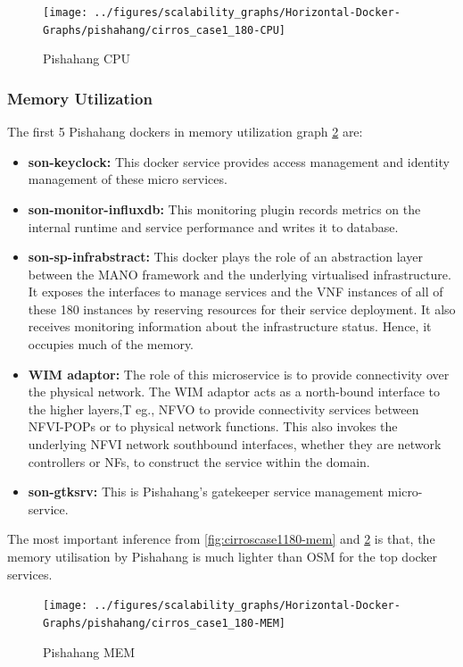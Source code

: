 \begin{figure}[h]
	\centering
	\texttt{[image: ../figures/scalability\_graphs/Horizontal-Docker-Graphs/pishahang/cirros\_case1\_180-CPU]}
	\caption{Pishahang CPU}
	\label{fig:pishcirroscase1180-cpu}
\end{figure}
\pagebreak
\subsubsection{Memory Utilization}
The first 5 Pishahang dockers in memory utilization graph \ref{fig:pishcirroscase1180-mem} are:

\begin{itemize}
	\item \textbf{son-keyclock:} This docker service provides access management and identity management of these micro services.
	\item \textbf{son-monitor-influxdb:} This monitoring plugin records metrics on the internal runtime and service performance and writes it to database.
	\item \textbf{son-sp-infrabstract:}  This docker plays the role of an abstraction layer between the MANO framework and the underlying virtualised infrastructure. It exposes the interfaces to manage services and the VNF instances of all of these 180 instances by reserving resources for their service deployment. It also receives monitoring information about the infrastructure status. Hence, it occupies much of the memory.
	
	\item \textbf{WIM adaptor:} The role of this microservice is to provide connectivity over the physical network. The WIM adaptor acts as a north-bound interface to the higher layers,T eg., NFVO to provide connectivity services between NFVI-POPs or to physical network functions. This also invokes the underlying NFVI network southbound interfaces, whether they are network controllers or NFs, to construct the service within the domain.
	
	\item \textbf{son-gtksrv:} This is Pishahang's gatekeeper service management micro-service.
	
\end{itemize}
 The most important inference from \ref{fig:cirroscase1180-mem} and \ref{fig:pishcirroscase1180-mem} is that, the memory utilisation by Pishahang is much lighter than OSM for the top docker services.



\begin{figure}[h]
	\centering
	\texttt{[image: ../figures/scalability\_graphs/Horizontal-Docker-Graphs/pishahang/cirros\_case1\_180-MEM]}
	\caption{Pishahang MEM}
	\label{fig:pishcirroscase1180-mem}
\end{figure}
\pagebreak

